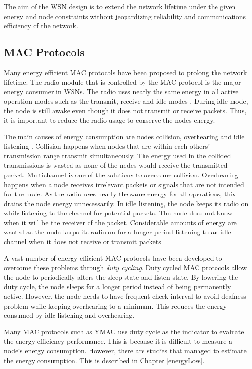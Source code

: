 The aim of the WSN design is to extend the network lifetime under the given energy and node constraints without jeopardizing reliability and communications efficiency of the network.

\subsection{MAC Protocols}
Many energy efficient MAC protocols have been proposed to prolong the network lifetime. The radio module that is controlled by the MAC protocol is the major energy consumer in WSNs. The radio uses nearly the same energy in all active operation modes such as the transmit, receive and idle modes \cite{alexlifetime}. During idle mode, the node is still awake even though it does not transmit or receive packets. Thus, it is important to reduce the radio usage to conserve the nodes energy.

The main causes of energy consumption are nodes collision, overhearing and idle listening \cite{macsurvey, pwmac}. Collision happens when nodes that are within each others' transmission range transmit simultaneously. The energy used in the collided transmissions is wasted as none of the nodes would receive the transmitted packet. Multichannel is one of the solutions to overcome collision. Overhearing happens when a node receives irrelevant packets or signals that are not intended for the node. As the radio uses nearly the same energy for all operations, this drains the node energy unnecessarily. In idle listening, the node keeps its radio on while listening to the channel for potential packets. The node does not know when it will be the receiver of the packet. Considerable amounts of energy are wasted as the node keeps its radio on for a longer period listening to an idle channel when it does not receive or transmit packets. 

A vast number of energy efficient MAC protocols have been developed to overcome these problems through \textit{duty cycling}. Duty cycled MAC protocols allow the node to periodically alters the sleep state and listen state. By lowering the duty cycle, the node sleeps for a longer period instead of being permanently active. However, the node needs to have frequent check interval to avoid deafness problem while keeping overhearing to a minimum. This reduces the energy consumed by idle listening and overhearing.

Many MAC protocols such as YMAC \cite{y-mac} use duty cycle as the indicator to evaluate the energy efficiency performance. This is because it is difficult to measure a node's energy consumption. However, there are studies that managed to estimate the energy consumption. This is described in Chapter \ref{energyLoss}.

